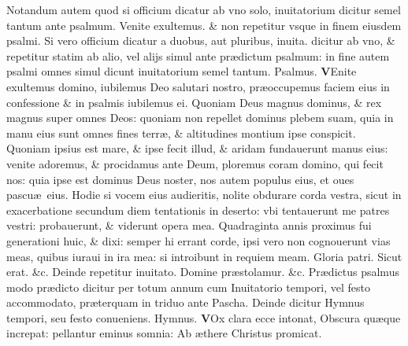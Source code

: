 \documentclass[a5paper,10pt]{book}
\def\ae{æ}
\begin{document}
\begin{multicols*}{2}
\newline {} \color{red} Notandum autem quod si officium dicatur ab vno solo, inuitatorium dicitur semel tantum ante psalmum. \color{black} Venite exultemus. \color{red} \& non repetitur vsque in finem eiusdem psalmi. Si vero officium dicatur a duobus, aut pluribus, inuita. dicitur ab vno, \& repetitur statim ab alio, vel alijs simul ante pr\ae dictum psalmum: 
in fine autem psalmi omnes simul dicunt inuitatorium semel tantum. Psalmus. \color{black}
\vspace{-.25em}
\lettrine[lines=2]{\bfseries \color{red} V}{}Enite exultemus domino, iubilemus Deo salutari nostro, pr\ae occupemus faciem eius in confessione \& in psalmis iubilemus ei.
\newline \color{red} Q\color{black}uoniam Deus magnus dominus, \& rex magnus super omnes Deos: quoniam non repellet dominus plebem suam, quia in manu eius sunt omnes fines terr\ae , \& altitudines montium ipse conspicit.
\newline \color{red} Q\color{black}uoniam ipsius est mare, \& ipse fecit illud, \& aridam fundauerunt manus eius: venite adoremus, \& procidamus ante Deum, ploremus coram domino, qui fecit nos: quia ipse est dominus Deus noster, nos autem populus eius, et oues pascu\ae \ eius.
\newline \color{red} H\color{black}odie si vocem eius audieritis, nolite obdurare corda vestra, sicut in exacerbatione secundum diem tentationis in deserto: vbi tentauerunt me patres vestri: probauerunt, \& viderunt opera mea.
\newline \color{red} Q\color{black}uadraginta annis proximus fui generationi huic, \& dixi: semper hi errant corde, ipsi vero non cognouerunt vias meas, quibus iuraui in ira mea: si introibunt in requiem meam.
\newline \color{red} G\color{black}loria patri. \color{red} S\color{black}icut erat. \&c.
\newline {} \color{red} Deinde repetitur inuitato. \color{black} Domine pr\ae stolamur. \color{red} \&c. \color{black}
\newline \color{red} Pr\ae dictus psalmus modo pr\ae dicto dicitur per totum annum cum Inuitatorio tempori, vel festo accommodato, pr\ae terquam in triduo ante Pascha. Deinde dicitur Hymnus tempori, seu festo conueniens. Hymnus. \color{black}
\vspace{-.25em}
\lettrine[lines=2]{\bfseries \color{red} V}{}Ox clara ecce intonat, Obscura qu\ae que increpat: pellantur eminus somnia: Ab \ae there Christus promicat.

\end{multicols*}
\end{document}
